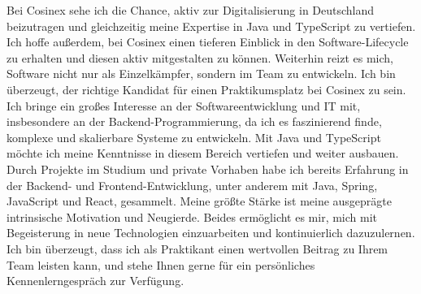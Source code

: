 \documentclass[11pt, a4paper]{awesome-cv}
\begin{document}
\begin{cvletter}
  Bei Cosinex sehe ich die Chance, aktiv zur Digitalisierung in Deutschland beizutragen und gleichzeitig meine Expertise in Java und TypeScript zu vertiefen.
  Ich hoffe außerdem, bei Cosinex einen tieferen Einblick in den Software-Lifecycle zu erhalten und diesen aktiv mitgestalten zu können.
  Weiterhin reizt es mich, Software nicht nur als Einzelkämpfer, sondern im Team zu entwickeln.
  \vspace{-1.5mm}
  Ich bin überzeugt, der richtige Kandidat für einen Praktikumsplatz bei Cosinex zu sein.
  Ich bringe ein großes Interesse an der Softwareentwicklung und IT mit, insbesondere an der Backend-Programmierung, da ich es faszinierend finde, komplexe und skalierbare Systeme zu entwickeln. Mit Java und TypeScript möchte ich meine Kenntnisse in diesem Bereich vertiefen und weiter ausbauen.
  Durch Projekte im Studium und private Vorhaben habe ich bereits Erfahrung in der Backend- und Frontend-Entwicklung, unter anderem mit Java, Spring, JavaScript und React, gesammelt.
  Meine größte Stärke ist meine ausgeprägte intrinsische Motivation und Neugierde.
  Beides ermöglicht es mir, mich mit Begeisterung in neue Technologien einzuarbeiten und kontinuierlich dazuzulernen.
  Ich bin überzeugt, dass ich als Praktikant einen wertvollen Beitrag zu Ihrem Team leisten kann, und stehe Ihnen gerne für ein persönliches Kennenlerngespräch zur Verfügung.
  \vspace{-1.5mm}
\end{cvletter}

\makeletterclosing
\end{document}
